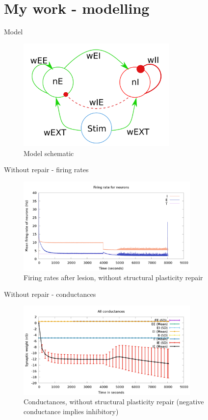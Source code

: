 \section{My work - modelling}
\begin{frame}{Model}
  \begin{figure}
    \includegraphics[keepaspectratio,width=0.7\textwidth]{99_images/model-schematic}
    \caption{Model schematic}
  \end{figure}
\end{frame}
\begin{frame}{Without repair - firing rates}
  \begin{figure}
    \includegraphics[keepaspectratio,width=0.8\textwidth]{99_images/201704272210-firing-rate-I-E-zoomed}
    \caption{Firing rates after lesion, without structural plasticity repair}
  \end{figure}
\end{frame}
\begin{frame}{Without repair - conductances}
  \begin{figure}
    \includegraphics[keepaspectratio,width=0.8\textwidth]{99_images/201704272210-all-conductances}
    \caption{Conductances, without structural plasticity repair (negative conductance implies inhibitory)}
  \end{figure}
\end{frame}

